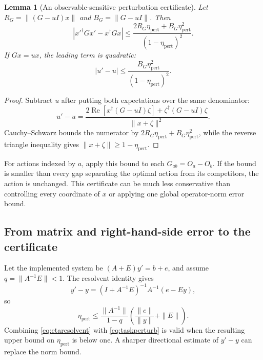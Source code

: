 \documentclass[11pt,a4paper]{article}
\newtheorem{lemma}[theorem]{Lemma}
\theoremstyle{definition}
\theoremstyle{remark}
\numberwithin{equation}{section}
\begin{document}
\begin{lemma}[An observable-sensitive perturbation certificate]\label{thm:perturb}
Let $R_G=\|(G-uI)x\|$ and $B_G=\|G-uI\|$. Then
\begin{equation}\label{eq:taskperturb}
 |x'^\dagger Gx'-x^\dagger Gx|
 \leq \frac{2R_G\eta_{\mathrm{pert}}+B_G\eta_{\mathrm{pert}}^2}{(1-\eta_{\mathrm{pert}})^2}.
\end{equation}
If $Gx=ux$, the leading term is quadratic:
\begin{equation}
 |u'-u|\leq\frac{B_G\eta_{\mathrm{pert}}^2}{(1-\eta_{\mathrm{pert}})^2}.
\end{equation}
\end{lemma}
\begin{proof}
Subtract $u$ after putting both expectations over the same denominator:
\begin{equation}
 u'-u=
 \frac{2\operatorname{Re}[x^\dagger(G-uI)\zeta]
       +\zeta^\dagger(G-uI)\zeta}{\|x+\zeta\|^2}.
\end{equation}
Cauchy--Schwarz bounds the numerator by
$2R_G\eta_{\mathrm{pert}}+B_G\eta_{\mathrm{pert}}^2$, while the reverse triangle inequality gives
$\|x+\zeta\|\geq1-\eta_{\mathrm{pert}}$.
\end{proof}

For actions indexed by $a$, apply this bound to each
$G_{ab}=O_a-O_b$. If the bound is smaller than every gap separating the
optimal action from its competitors, the action is unchanged.
This certificate can be much less conservative than controlling every
coordinate of $x$ or applying one global operator-norm error bound.

\subsection{From matrix and right-hand-side error to the certificate}
Let the implemented system be $(A+E)y'=b+e$, and assume
$q=\|A^{-1}E\|<1$. The resolvent identity gives
\begin{equation}
 y'-y=(I+A^{-1}E)^{-1}A^{-1}(e-Ey),
\end{equation}
so
\begin{equation}\label{eq:etaresolvent}
 \eta_{\mathrm{pert}}\leq
 \frac{\|A^{-1}\|}{1-q}
 \left(\frac{\|e\|}{\|y\|}+\|E\|\right).
\end{equation}
Combining \eqref{eq:etaresolvent} with \eqref{eq:taskperturb} is valid
when the resulting upper bound on $\eta_{\mathrm{pert}}$ is below one.
A sharper directional estimate of $y'-y$ can replace the norm bound.
\end{document}
